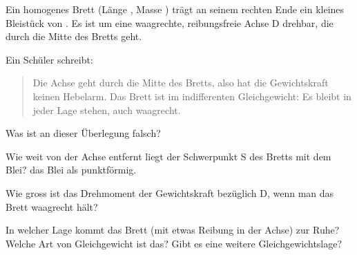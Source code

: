 Ein homogenes Brett (Länge \LBO, Masse \mBO) trägt an seinem rechten Ende ein kleines Bleistück von \mPbO. Es ist um eine waagrechte, reibungsfreie Achse D drehbar, die durch die Mitte des Bretts geht.
\begin{center}
\end{center}
Ein Schüler schreibt:

\begin{quote}
Die Achse geht durch die Mitte des Bretts, also hat die Gewichtskraft keinen Hebelarm. Das Brett ist im indifferenten Gleichgewicht: Es bleibt in jeder Lage stehen, auch waagrecht.
\end{quote}

\begin{abcliste}
\abc
Was ist an dieser Überlegung falsch?

\abc
Wie weit von der Achse entfernt liegt der Schwerpunkt S des Bretts mit dem Blei?  das Blei als punktförmig.

\abc
Wie gross ist das Drehmoment der Gewichtskraft bezüglich D, wenn man das Brett waagrecht hält?

\abc
In welcher Lage kommt das Brett (mit etwas Reibung in der Achse) zur Ruhe? Welche Art von Gleichgewicht ist das? Gibt es eine weitere Gleichgewichtslage?
\end{abcliste}
